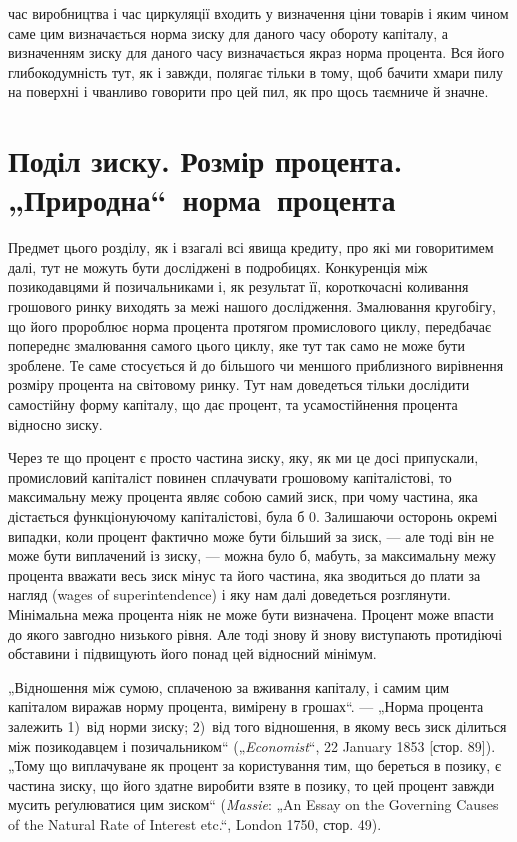 \parcont{}  %
час виробництва і час циркуляції входить у визначення ціни
товарів і яким чином саме цим визначається норма зиску для
даного часу обороту капіталу, а визначенням зиску для даного
часу визначається якраз норма процента. Вся його глибокодумність
тут, як і завжди, полягає тільки в тому, щоб бачити хмари
пилу на поверхні і чванливо говорити про цей пил, як про щось
таємниче й значне.

\section{Поділ зиску. Розмір процента.
„Природна“~норма~процента}

Предмет цього розділу, як і взагалі всі явища кредиту, про
які ми говоритимем далі, тут не можуть бути досліджені в подробицях.
Конкуренція між позикодавцями й позичальниками і,
як результат її, короткочасні коливання грошового ринку виходять
за межі нашого дослідження. Змалювання кругобігу, що
його пророблює норма процента протягом промислового циклу,
передбачає попереднє змалювання самого цього циклу, яке тут
так само не може бути зроблене. Те саме стосується й до більшого
чи меншого приблизного вирівнення розміру процента
на світовому ринку. Тут нам доведеться тільки дослідити самостійну
форму капіталу, що дає процент, та усамостійнення процента
відносно зиску.

Через те що процент є просто частина зиску, яку, як ми
це досі припускали, промисловий капіталіст повинен сплачувати
грошовому капіталістові, то максимальну межу процента
являє собою самий зиск, при чому частина, яка дістається функціонуючому
капіталістові, була б \deq{} 0. Залишаючи осторонь окремі
випадки, коли процент фактично може бути більший за зиск, —
але тоді він не може бути виплачений із зиску, — можна було б,
мабуть, за максимальну межу процента вважати весь зиск мінус
та його частина, яка зводиться до плати за нагляд (wages
of superintendence) і яку нам далі доведеться розглянути. Мінімальна
межа процента ніяк не може бути визначена. Процент
може впасти до якого завгодно низького рівня. Але тоді знову
й знову виступають протидіючі обставини і підвищують його
понад цей відносний мінімум.

„Відношення між сумою, сплаченою за вживання капіталу,
і самим цим капіталом виражав норму процента, вимірену в
грошах“. — „Норма процента залежить 1)~від норми зиску; 2)~від
того відношення, в якому весь зиск ділиться між позикодавцем
і позичальником“ („\emph{Economist}“, 22 January 1853 [стор. 89]). „Тому
що виплачуване як процент за користування тим, що береться в
позику, є частина зиску, що його здатне виробити взяте в позику,
то цей процент завжди мусить реґулюватися цим зиском“
(\emph{Massie}: „An Essay on the Governing Causes of the Natural Rate of
Interest etc.“, London 1750, стор. 49).
